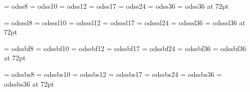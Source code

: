 \def\odbsVIII{\odbs@VIII\baselineskip=9pt}
\def\odbs{\odbs@X\baselineskip=12pt}
\def\odbsXII{\odbs@XII\baselineskip=15pt}
\def\odbsXVII{\odbs@XVII\baselineskip=20pt}
\def\odbsXXIV{\odbs@XXIV\baselineskip=26pt}
\def\odbsXXXVI{\odbs@XXXVI\baselineskip=36pt}
\def\odbsLXXII{\odbs@LXXII\baselineskip=72pt}



\font\odss@VIII     = odss8
\font\odss@X	    = odss10
\font\odss@XII      = odss12
\font\odss@XVII	    = odss17
\font\odss@XXIV     = odss24
\font\odss@XXXVI    = odss36
\font\odss@LXXII    = odss36 at 72pt

\font\odsssl@VIII   = odsssl8
\font\odsssl@X      = odsssl10
\font\odsssl@XII    = odsssl12
\font\odsssl@XVII   = odsssl17
\font\odsssl@XXIV   = odsssl24
\font\odsssl@XXXVI  = odsssl36
\font\odsssl@LXXII  = odsssl36 at 72pt

\font\odssbf@VIII   = odssbf8
\font\odssbf@X      = odssbf10
\font\odssbf@XII    = odssbf12
\font\odssbf@XVII   = odssbf17
\font\odssbf@XXIV   = odssbf24
\font\odssbf@XXXVI  = odssbf36
\font\odssbf@LXXII  = odssbf36 at 72pt

\font\odssbs@VIII   = odssbs8
\font\odssbs@X      = odssbs10
\font\odssbs@XII    = odssbs12
\font\odssbs@XVII   = odssbs17
\font\odssbs@XXIV   = odssbs24
\font\odssbs@XXXVI  = odssbs36
\font\odssbs@LXXII  = odssbs36 at 72pt

\def\odssVIII{\odss@VIII\baselineskip=9pt}
\def\odss{\odss@X\baselineskip=12pt}
\def\odssXII{\odss@XII\baselineskip=15pt}
\def\odssXVII{\odss@XVII\baselineskip=20pt}
\def\odssXXIV{\odss@XXIV\baselineskip=26pt}
\def\odssXXXVI{\odss@XXXVI\baselineskip=36pt}
\def\odssLXXII{\odss@LXXII\baselineskip=72pt}

\def\odssslVIII{\odsssl@VIII\baselineskip=9pt}
\def\odsssl{\odsssl@X\baselineskip=12pt}
\def\odssslXII{\odsssl@XII\baselineskip=15pt}
\def\odssslXVII{\odsssl@XVII\baselineskip=20pt}
\def\odssslXXIV{\odsssl@XXIV\baselineskip=26pt}
\def\odssslXXXVI{\odsssl@XXXVI\baselineskip=36pt}
\def\odssslLXXII{\odsssl@LXXII\baselineskip=72pt}

\def\odssbfVIII{\odssbf@VIII\baselineskip=9pt}
\def\odssbf{\odssbf@X\baselineskip=12pt}
\def\odssbfXII{\odssbf@XII\baselineskip=15pt}
\def\odssbfXVII{\odssbf@XVII\baselineskip=20pt}
\def\odssbfXXIV{\odssbf@XXIV\baselineskip=26pt}
\def\odssbfXXXVI{\odssbf@XXXVI\baselineskip=36pt}
\def\odssbfLXXII{\odssbf@LXXII\baselineskip=72pt}


